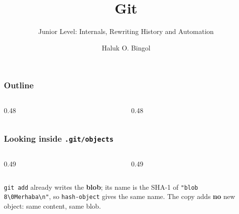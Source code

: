 \documentclass[aspectratio=169,10pt,compress]{beamer}
\title{Git}
\subtitle{Junior Level: Internals, Rewriting History and Automation}
\author[Bingol]{Haluk O. Bingol}
\institute[FCIS]{
    Faculty of Computer and Information Sciences\\
    Yeditepe University
}
\date{
	{\tiny \hbTimeStamp}
}
\begin{document}
\begin{frame}[t,fragile]
  \titlepage
\end{frame}




\begin{frame}[t,fragile] \frametitle{Outline}
  \begin{columns}[T]
    \begin{column}{0.48\textwidth}
      \tableofcontents[sections={1-3}, hideallsubsections]
    \end{column}
    \begin{column}{0.48\textwidth}
      \tableofcontents[sections={4-6}, hideallsubsections]
    \end{column}
  \end{columns}
\end{frame}





\begin{frame}[t,fragile] \frametitle{Looking inside \texttt{.git/objects}}
  \begin{columns}[T]
    \begin{column}{0.49\textwidth}
    \end{column}
    \begin{column}{0.49\textwidth}
    \end{column}
  \end{columns}

  \vspace{0.1em}
  \small
  \texttt{git add} already writes the \textbf{blob}; its name is the SHA-1 of \texttt{"blob 8\textbackslash 0Merhaba\textbackslash n"}, so
  \texttt{hash-object} gives the same name. The copy adds \textbf{no} new object: same content, same blob.
\end{frame}
\end{document}
